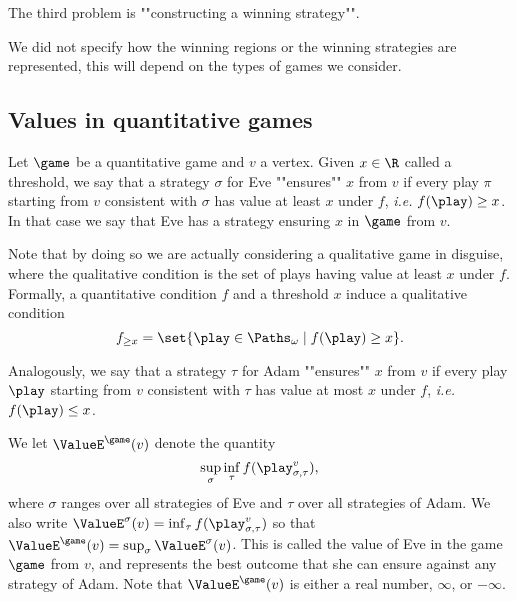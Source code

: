 
The third problem is ""constructing a winning strategy"".


We did not specify how the winning regions or the winning strategies are represented, this will depend on the types of games we consider.

\subsection*{Values in quantitative games}
Let $\game$ be a quantitative game and $v$ a vertex.
Given $x \in \R$ called a threshold, we say that a strategy $\sigma$ for Eve ""ensures"" $x$ from $v$ 
if every play $\pi$ starting from $v$ consistent with $\sigma$ has value at least $x$ under $f$,
\textit{i.e.} $f(\play) \ge x$.
In that case we say that Eve has a strategy ensuring $x$ in $\game$ from $v$.

Note that by doing so we are actually considering a qualitative game in disguise, 
where the qualitative condition is the set of plays having value at least $x$ under $f$.
Formally, a quantitative condition $f$ and a threshold $x$ induce a qualitative condition 
\[
f_{\ge x} = \set{\play \in \Paths_\omega \mid f(\play) \ge x}.
\]

Analogously, we say that a strategy $\tau$ for Adam ""ensures"" $x$ from $v$ 
if every play $\play$ starting from $v$ consistent with $\tau$ has value at most $x$ under $f$,
\textit{i.e.} $f(\play) \le x$.


We let $\ValueE^{\game}(v)$ denote the quantity
\[
\sup_{\sigma} \inf_{\tau} f(\play_{\sigma,\tau}^{v}),
\]
where $\sigma$ ranges over all strategies of Eve and $\tau$ over all strategies of Adam.
We also write $\ValueE^{\sigma}(v) = \inf_{\tau} f(\play_{\sigma,\tau}^{v})$
so that $\ValueE^{\game}(v) = \sup_{\sigma} \ValueE^\sigma(v)$.
This is called the value of Eve in the game $\game$ from $v$,
and represents the best outcome that she can ensure against any strategy of Adam.
Note that $\ValueE^{\game}(v)$ is either a real number, $\infty$, or $-\infty$.


